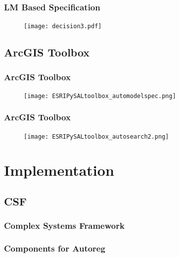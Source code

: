 \documentclass[usepdftitle=false,professionalfonts,compress ]{beamer}
\begin{document}
{
\begin{frame}\frametitle{LM Based Specification}

\begin{figure}
	\texttt{[image: decision3.pdf]}\end{figure}
\end{frame}
}





\subsection{ArcGIS Toolbox}



{
\begin{frame}\frametitle{ArcGIS Toolbox}

\begin{figure}
	\texttt{[image: ESRIPySALtoolbox\_automodelspec.png]}\end{figure}
\end{frame}
}





{
\begin{frame}\frametitle{ArcGIS Toolbox}

\begin{figure}
	\texttt{[image: ESRIPySALtoolbox\_autosearch2.png]}\end{figure}
\end{frame}
}






\section{Implementation}
		


\subsection{CSF}



{
\begin{frame}\frametitle{Complex Systems Framework}

\end{frame}
}




{
\begin{frame}\frametitle{Components for Autoreg}

\end{frame}
}
\end{document}
